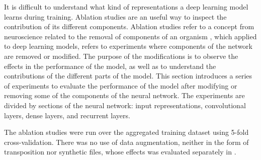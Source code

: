 
It is difficult to understand what kind of representations a
deep learning model learns during training. Ablation studies
are an useful way to inspect the contribution of its
different components. Ablation studies refer to a concept
from neuroscience related to the removal of components of an
organism \parencite{meyes2019ablation}, which applied to
deep learning models, refers to experiments where components
of the network are removed or modified. The purpose of the
modifications is to observe the effects in the performance
of the model, as well as to understand the contributions of
the different parts of the model. This section introduces a
series of experiments to evaluate the performance of the
model after modifying or removing some of the components of
the neural network. The experiments are divided by sections
of the neural network: input representations, convolutional
layers, dense layers, and recurrent layers.

The ablation studies were run over the aggregated training
dataset using 5-fold cross-validation. There was no use of
data augmentation, neither in the form of transposition nor
synthetic files, whose effects was evaluated separately in
.
